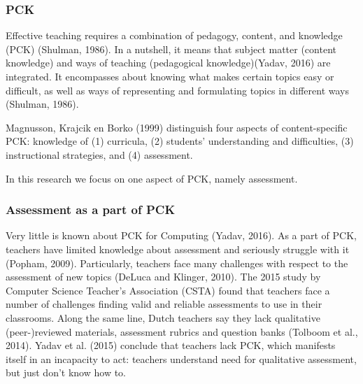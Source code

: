 \subsubsection*{PCK}

Effective teaching requires a combination of pedagogy, content, and knowledge (PCK) (Shulman, 1986). In a nutshell, it means that subject matter (content knowledge) and ways of teaching (pedagogical knowledge)(Yadav, 2016) are integrated. It encompasses about knowing what makes certain topics easy or difficult, as well as ways of representing and formulating topics in different ways (Shulman, 1986).

Magnusson, Krajcik en Borko (1999) distinguish four aspects of content-specific PCK: knowledge of
(1) curricula, (2) students' understanding and difficulties, (3) instructional strategies, and (4) assessment.


In this research we focus on one aspect of PCK, namely assessment. 


\subsubsection*{Assessment as a part of PCK}
Very little is known about PCK for Computing (Yadav, 2016). As a part of PCK, teachers have limited knowledge about assessment and seriously struggle with it (Popham, 2009). Particularly, teachers face many challenges with respect to the assessment of new topics (DeLuca and Klinger, 2010). The 2015 study by Computer Science Teacher's Association (CSTA) found that teachers face a number of challenges finding valid and reliable assessments to use in their classrooms. Along the same line, Dutch teachers say they lack qualitative (peer-)reviewed materials, assessment rubrics and question banks (Tolboom et al., 2014). Yadav et al. (2015) conclude that teachers lack PCK, which manifests itself in an incapacity to act: teachers understand need for qualitative assessment, but just don't know how to.


